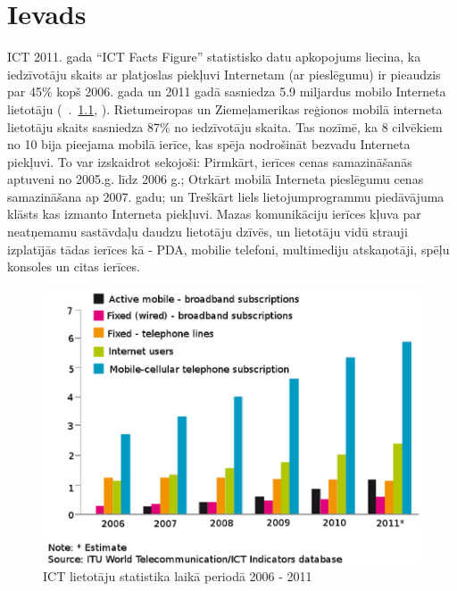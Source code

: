 \chapter{Ievads}
ICT 2011. gada “ICT Facts Figure” statistisko datu apkopojums liecina, ka iedzīvotāju skaits ar platjoslas piekļuvi Internetam (ar pieslēgumu) ir pieaudzis par 45\% kopš 2006. gada un 2011 gadā sasniedza 5.9 miljardus mobilo Interneta lietotāju (\seename ~\figurename .~\ref{fig:mobilStat}, \cite{ict}). Rietumeiropas un Ziemeļamerikas reģionos mobilā interneta lietotāju skaits sasniedza 87\% no iedzīvotāju skaita. Tas nozīmē, ka 8 cilvēkiem no 10 bija pieejama mobilā ierīce, kas spēja nodrošināt bezvadu Interneta piekļuvi. To var izskaidrot sekojoši: Pirmkārt, ierīces cenas samazināšanās aptuveni no 2005.g. līdz 2006 g.; Otrkārt mobilā Interneta pieslēgumu cenas samazināšana ap 2007. gadu; un Treškārt liels lietojumprogrammu piedāvājuma klāsts kas izmanto Interneta piekļuvi. Mazas komunikāciju ierīces kļuva par neatņemamu sastāvdaļu daudzu lietotāju dzīvēs, un lietotāju vidū strauji izplatījās tādas ierīces kā - PDA, mobilie telefoni, multimediju atskaņotāji, spēļu konsoles un citas ierīces.
\begin{figure}[ht!]
    \centering
\includegraphics[scale=0.8]{./graph/mobuser1}
\caption{ICT lietotāju statistika laikā periodā 2006 - 2011 \cite{ict}}
\label{fig:mobilStat}
\end{figure}

